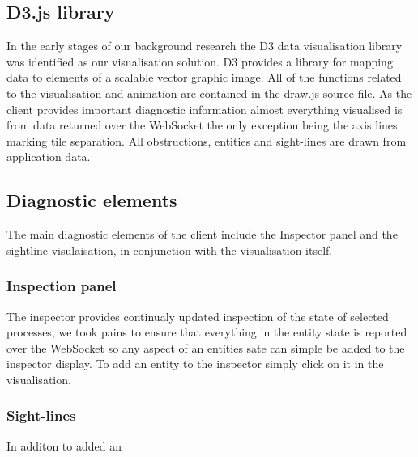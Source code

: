\subsection{D3.js library}
In the early stages of our background research the D3 data visualisation library was identified as our visualisation solution. D3 provides a library for mapping data to elements of a scalable vector graphic image. All of the functions related to the visualisation and animation are contained in the draw.js source file. As the client provides important diagnostic information almost everything visualised is from data returned over the WebSocket the only exception being the axis lines marking tile separation. All obstructions, entities and sight-lines are drawn from application data.
\subsection{Diagnostic elements}
The main diagnostic elements of the client include the Inspector panel and the sightline visulaisation, in conjunction with the visualisation itself.
\subsubsection{Inspection panel}
The inspector provides continualy updated inspection of the state of selected processes, we took pains to ensure that everything in the entity state is reported over the WebSocket so any aspect of an entities sate can simple be added to the inspector display. To add an entity to the inspector simply click on it in the visualisation.
\subsubsection{Sight-lines}
In additon to added an

\clearpage
\endinput
